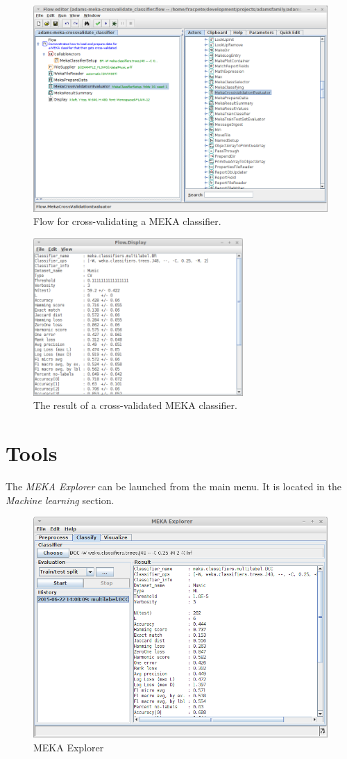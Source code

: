 \documentclass[a4paper]{book}
\begin{document}
\begin{figure}[htb]
  \centering
  \includegraphics[width=12.0cm]{images/crossvalidate-flow.png}
  \caption{Flow for cross-validating a MEKA classifier.}
  \label{crossvalidate-flow}
\end{figure}

\begin{figure}[htb]
  \centering
  \includegraphics[width=8.0cm]{images/crossvalidate-output.png}
  \caption{The result of a cross-validated MEKA classifier.}
  \label{crossvalidate-output}
\end{figure}

\chapter{Tools}
The \textit{MEKA Explorer} can be launched from the main menu. It is located
in the \textit{Machine learning} section.

\begin{figure}[htb]
  \centering
  \includegraphics[width=12.0cm]{images/explorer.png}
  \caption{MEKA Explorer}
  \label{explorer}
\end{figure}



\end{document}
